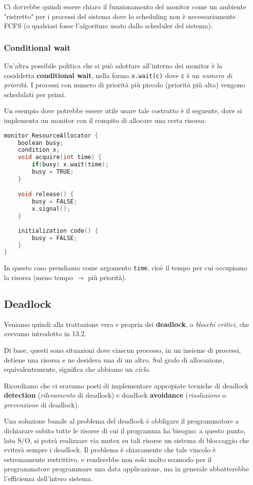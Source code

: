 \documentclass[a4paper,11pt]{article}
\begin{document}
Ci dovrebbe quindi essere chiaro il funzionamento del monitor come un ambiente "ristretto" per i processi del sistema dove lo scheduling non è necessariamente FCFS (o qualsiasi fosse l'algoritmo usato dallo scheduler del sistema).

\subsubsection{Conditional wait}
Un'altra possibile politica che si può adottare all'interno dei monitor è la cosiddetta \textbf{conditional wait}, nella forma \lstinline|x.wait(c)| dove \lstinline|c| è un \textit{numero di priorità}. I processi con numero di priorità più piccolo (priorità più alta) vengono schedulati per primi.

Un esempio dove potrebbe essere utile usare tale costrutto è il seguente, dove si implementa un monitor con il compito di allocare una certa risorsa:
\begin{lstlisting}[language=C++, style=codestyle]	
monitor ResourceAllocator {
	boolean busy;
	condition x;
	void acquire(int time) {
		if(busy) x.wait(time);
		busy = TRUE;
	}

	void release() {
		busy = FALSE;
		x.signal();
	}
	
	initialization code() {
		busy = FALSE;
	}
}
\end{lstlisting}

In questo caso prendiamo come argomento \lstinline|time|, cioè il tempo per cui occupiamo la risorsa (meno tempo $\rightarrow$ più priorità).

\subsection{Deadlock}
Veniamo quindi alla trattazione vera e propria dei \textbf{deadlock}, o \textit{blocchi critici}, che avevamo introdotto in 13.2.

Di base, questi sono situazioni dove ciascun processo, in un insieme di processi, detiene una risorsa e ne desidera una di un altro.
Sul grafo di allocazione, equivalentemente, significa che abbiamo un \textit{ciclo}.

Ricordiamo che ci eravamo posti di implementare appropiate tecniche di deadlock \textbf{detection} (\textit{rilevamento} di deadlock) e deadlock \textbf{avoidance} (\textit{risoluzione} o \textit{prevenzione} di deadlock).

Una soluzione banale al problema del deadlock è obbligare il programmatore a dichiarare subito tutte le risorse di cui il programma ha bisogno: a questo punto, lato S/O, si potrà realizzare via mutex su tali risorse un sistema di bloccaggio che eviterà sempre i deadlock.
Il problema è chiaramente che tale vincolo è estremamente restrittivo, e renderebbe non solo molto scomodo per il programmatore programmare una data applicazione, ma in generale abbatterebbe l'efficienza dell'intero sistema.
\end{document}

